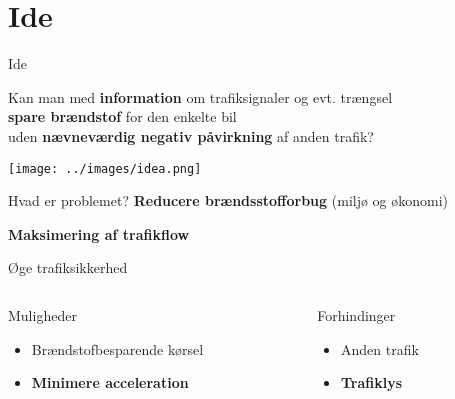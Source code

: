 \section{Ide}

\begin{frame}{Ide}
\begin{center}
Kan man med \textbf{information} om trafiksignaler og evt. trængsel\\\textbf{spare brændstof} for den enkelte bil\\uden \textbf{nævneværdig negativ påvirkning} af anden trafik?
\end{center}
\texttt{[image: ../images/idea.png]}
\end{frame}

\begin{frame}{Hvad er problemet?}
\textbf{Reducere brændsstofforbug} (miljø og økonomi)

\textbf{Maksimering af trafikflow}

Øge trafiksikkerhed

\vspace{5mm}
\begin{columns}
\begin{column}{0.5\textwidth}
Muligheder
\begin{itemize}
\item Brændstofbesparende kørsel
\item \textbf{Minimere acceleration}
\end{itemize}

\end{column}
\begin{column}{0.4\textwidth}
Forhindinger
\begin{itemize}
\item Anden trafik
\item \textbf{Trafiklys}
\end{itemize}
\end{column}
\end{columns}
\end{frame}

